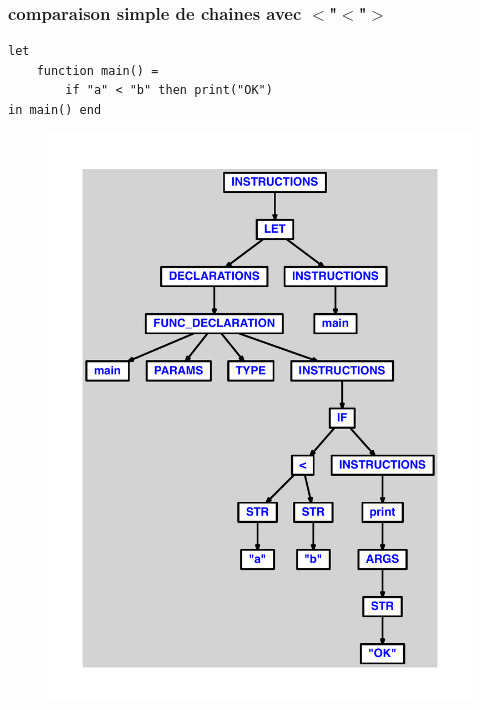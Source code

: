 \documentclass{article}
\begin{document}
\subsubsection{comparaison simple de chaines avec $ < $"$ < $"$ > $}
\begin{lstlisting}
let
	function main() =
		if "a" < "b" then print("OK")
in main() end
\end{lstlisting}
\newpage
\begin{figure}[H]
\centering
\includegraphics[max width=\textwidth]{ast/ast_175.pdf}
\end{figure}
\newpage
\end{document}
